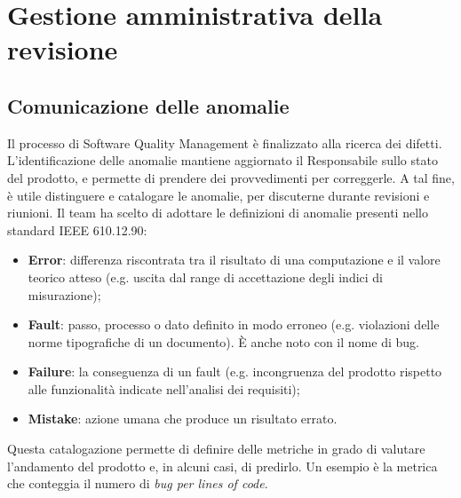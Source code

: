 \section{Gestione amministrativa della revisione}
\subsection{Comunicazione delle anomalie}
Il processo di Software Quality Management è finalizzato alla ricerca dei difetti. L'identificazione delle anomalie mantiene aggiornato il Responsabile sullo stato del prodotto, e permette di prendere dei provvedimenti per correggerle. A tal fine, è utile distinguere e catalogare le anomalie, per discuterne durante revisioni e riunioni. Il team ha scelto di adottare le definizioni di anomalie presenti nello standard IEEE 610.12.90:
\begin{itemize}
\item \textbf{Error}: differenza riscontrata tra il risultato di una computazione e il valore teorico atteso (e.g. uscita dal range di accettazione degli indici di misurazione);
\item \textbf{Fault}: passo, processo o dato definito in modo erroneo (e.g. violazioni delle norme tipografiche di un documento). \`E anche noto con il nome di bug.
\item \textbf{Failure}: la conseguenza di un fault (e.g. incongruenza del prodotto rispetto alle funzionalità indicate nell'analisi dei requisiti);
\item \textbf{Mistake}: azione umana che produce un risultato errato.
\end{itemize}
Questa catalogazione permette di definire delle metriche in grado di valutare l'andamento del prodotto e, in alcuni casi, di predirlo. Un esempio è la metrica che conteggia il numero di \textit{bug per lines of code}.


